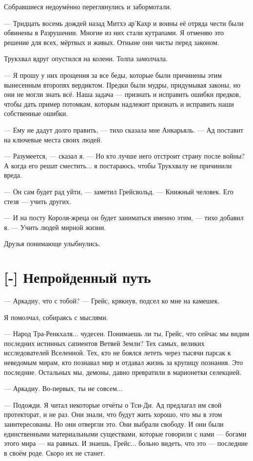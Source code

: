 Собравшиеся недоумённо переглянулись и забормотали.

--- Тридцать восемь дождей назад Митхэ ар'Кахр и воины её отряда чести были обвинены в Разрушении.
Многие из них стали кутрапами.
Я отменяю это решение для всех, мёртвых и живых.
Отныне они чисты перед законом.

Трукхвал вдруг опустился на колени.
Толпа замолчала.

--- Я прошу у них прощения за все беды, которые были причинены этим вынесенным второпях вердиктом.
Предки были мудры, придумывая законы, но они не могли знать всё.
Наша задача --- признать и исправить ошибки предков, чтобы дать пример потомкам, которым надлежит признать и исправить наши собственные ошибки.

--- Ему не дадут долго править, --- тихо сказала мне Анкарьяль.
--- Ад поставит на ключевые места своих людей.

--- Разумеется, --- сказал я.
--- Но кто лучше него отстроит страну после войны?
А когда его решат сместить... я постараюсь, чтобы Трукхвалу не причинили вреда.

--- Он сам будет рад уйти, --- заметил Грейсвольд.
--- Книжный человек.
Его стезя --- учить других.

--- И на посту Короля-жреца он будет заниматься именно этим, --- тихо добавил я.
--- Учить людей мирной жизни.

Друзья понимающе улыбнулись.

\section{[-] Непройденный путь}

\textspace

--- Аркадиу, что с тобой? --- Грейс, крякнув, подсел ко мне на камешек.

Я помолчал, собираясь с мыслями.

--- Народ Тра-Ренкхаля... чудесен.
Понимаешь ли ты, Грейс, что сейчас мы видим последних истинных сапиентов Ветвей Земли?
Тех самых, великих исследователей Вселенной.
Тех, кто не боялся лететь через тысячи парсак к неведомым мирам, кто познавал мир и отдавал жизнь за крупицу познания.
Это последние.
Остальных мы, демоны, давно превратили в марионетки селекцией.

--- Аркадиу.
Во-первых, ты не совсем...

--- Подожди.
Я читал некоторые отчёты о Тси-Ди.
Ад предлагал им свой протекторат, и не раз.
Они знали, что будут жить хорошо, что мы в этом заинтересованы.
Но они отвергли это.
Они выбрали свободу.
И они были единственными материальными существами, которые говорили с нами --- богами этого мира --- на равных.
И знаешь, Грейс... больно видеть, что это --- последние в своём роде.
Скоро их не станет.

